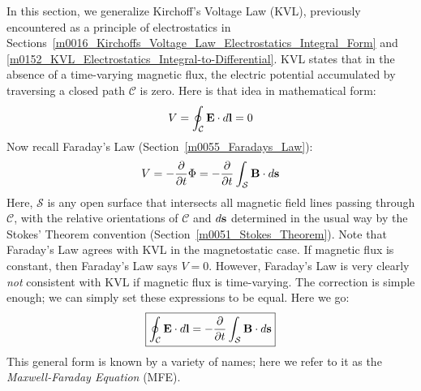 

\label{m0050_Maxwell-Faraday_Equation} %

In this section, we generalize Kirchoff's Voltage Law (KVL), 
previously encountered as a principle of electrostatics in Sections~\ref{m0016_Kirchoffs_Voltage_Law_Electrostatics_Integral_Form} and \ref{m0152_KVL_Electrostatics_Integral-to-Differential}.
KVL states that in the absence of a time-varying magnetic flux, the electric potential accumulated by traversing a closed path $\mathcal{C}$ is zero.
Here is that idea in mathematical form:
%
\begin{equation}   
V = \oint_{\mathcal{C}}{ {\bf E} \cdot d{\bf l} } = 0
\end{equation}
%
Now recall Faraday's Law 
(Section~\ref{m0055_Faradays_Law}): 
%
\begin{equation}
V = - \frac{\partial}{\partial t} \Phi = - \frac{\partial}{\partial t} \int_{\mathcal{S}} { {\bf B} \cdot d{\bf s} }
\end{equation}
%
Here, $\mathcal{S}$ is any open surface that intersects all magnetic field lines passing through $\mathcal{C}$, with the relative orientations of $\mathcal{C}$ and $d{\bf s}$ determined in the usual way by the Stokes' Theorem 
convention (Section~\ref{m0051_Stokes_Theorem}).
Note that Faraday's Law agrees with KVL in the magnetostatic case. If magnetic flux is constant, then Faraday's Law says $V=0$. 
However, Faraday's Law is very clearly \emph{not} consistent with KVL if magnetic flux is time-varying.
The correction is simple enough; we can simply set these expressions to be equal.
Here we go:
%
\begin{equation} 
\boxed{  
\oint_{\mathcal{C}}{ {\bf E} \cdot d{\bf l} } = - \frac{\partial}{\partial t} \int_{\mathcal{S}} { {\bf B} \cdot d{\bf s} }
}
\label{m0050_eMFEI}
\end{equation}
%
This general form is known by a variety of names; here we refer to it as the \emph{Maxwell-Faraday Equation} (MFE).

